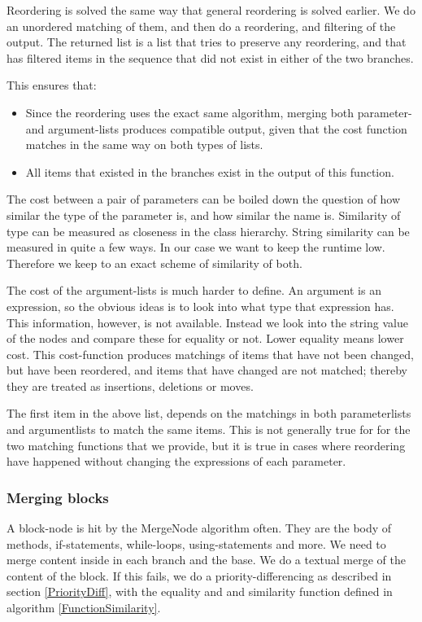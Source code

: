 \documentclass[11pt]{article}
\begin{document}
Reordering is solved the same way that general reordering is solved earlier. We do an unordered matching of them, and then do a reordering, and filtering of the output. The returned list is a list that tries to preserve any reordering, and that has filtered items in the sequence that did not exist in either of the two branches.

This ensures that:

\begin{itemize}
   \item Since the reordering uses the exact same algorithm, merging both parameter- and argument-lists produces compatible output, given that the cost function matches in the same way on both types of lists.
   \item All items that existed in the branches exist in the output of this function. 
\end{itemize}

The cost between a pair of parameters can be boiled down the question of how similar the type of the parameter is, and how similar the name is. Similarity of type can be measured as closeness in the class hierarchy. String similarity can be measured in quite a few ways. In our case we want to keep the runtime low. Therefore we keep to an exact scheme of similarity of both.

The cost of the argument-lists is much harder to define. An argument is an expression, so the obvious ideas is to look into what type that expression has. This information, however, is not available. Instead we look into the string value of the nodes and compare these for equality or not. Lower equality means lower cost. This cost-function produces matchings of items that have not been changed, but have been reordered, and items that have changed are not matched; thereby they are treated as insertions, deletions or moves.

The first item in the above list, depends on the matchings in both parameterlists and argumentlists to match the same items. This is not generally true for for the two matching functions that we provide, but it is true in cases where reordering have happened without changing the expressions of each parameter.


\subsubsection{Merging blocks}
A block-node is hit by the MergeNode algorithm often. They are the body of methods, if-statements, while-loops, using-statements and more. We need to merge content inside in each branch and the base. We do a textual merge of the content of the block. If this fails, we do a priority-differencing as described in section \ref{PriorityDiff}, with the equality and and similarity function defined in algorithm \ref{FunctionSimilarity}.
\end{document}
